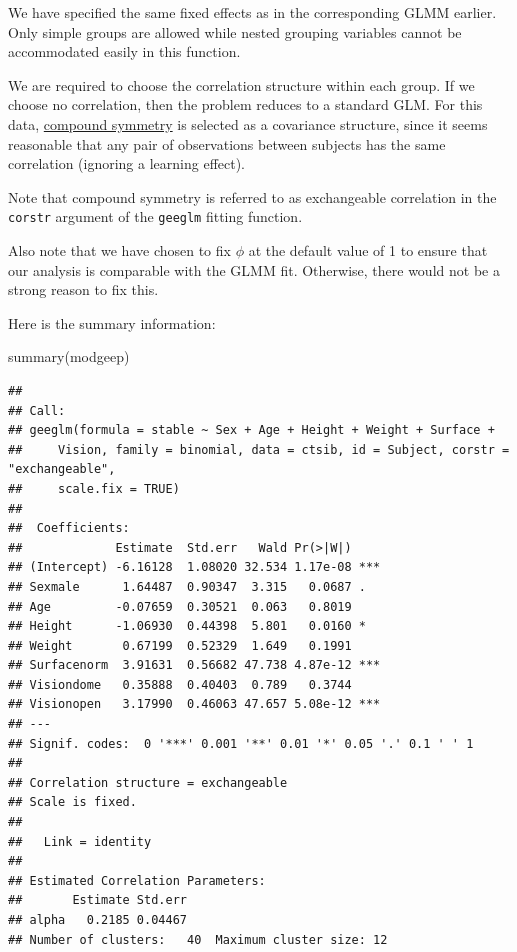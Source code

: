 \documentclass[
  ignorenonframetext,
]{beamer}
\newenvironment{Shaded}{\begin{snugshade}}{\end{snugshade}}
\newcommand{\FunctionTok}[1]{\textcolor[rgb]{0.00,0.00,0.00}{#1}}
\newcommand{\NormalTok}[1]{#1}
\begin{document}
\begin{frame}{}
\protect\hypertarget{section-20}{}
We have specified the same fixed effects as in the corresponding GLMM
earlier. Only simple groups are allowed while nested grouping variables
cannot be accommodated easily in this function.

We are required to choose the correlation structure within each group.
If we choose no correlation, then the problem reduces to a standard GLM.
For this data,
\href{https://norcalbiostat.github.io/AppliedStatistics_notes/specifying-correlation-structures.html}{compound
symmetry} is selected as a covariance structure, since it seems
reasonable that any pair of observations between subjects has the same
correlation (ignoring a learning effect).

Note that compound symmetry is referred to as exchangeable correlation
in the \texttt{corstr} argument of the \texttt{geeglm} fitting function.

Also note that we have chosen to fix \(\phi\) at the default value of 1
to ensure that our analysis is comparable with the GLMM fit. Otherwise,
there would not be a strong reason to fix this.
\end{frame}

\begin{frame}[fragile]{}
\protect\hypertarget{section-21}{}
Here is the summary information:

\vspace{12pt}
\tiny

\begin{Shaded}
\begin{Highlighting}[]
\FunctionTok{summary}\NormalTok{(modgeep)}
\end{Highlighting}
\end{Shaded}

\begin{verbatim}
## 
## Call:
## geeglm(formula = stable ~ Sex + Age + Height + Weight + Surface + 
##     Vision, family = binomial, data = ctsib, id = Subject, corstr = "exchangeable", 
##     scale.fix = TRUE)
## 
##  Coefficients:
##             Estimate  Std.err   Wald Pr(>|W|)    
## (Intercept) -6.16128  1.08020 32.534 1.17e-08 ***
## Sexmale      1.64487  0.90347  3.315   0.0687 .  
## Age         -0.07659  0.30521  0.063   0.8019    
## Height      -1.06930  0.44398  5.801   0.0160 *  
## Weight       0.67199  0.52329  1.649   0.1991    
## Surfacenorm  3.91631  0.56682 47.738 4.87e-12 ***
## Visiondome   0.35888  0.40403  0.789   0.3744    
## Visionopen   3.17990  0.46063 47.657 5.08e-12 ***
## ---
## Signif. codes:  0 '***' 0.001 '**' 0.01 '*' 0.05 '.' 0.1 ' ' 1
## 
## Correlation structure = exchangeable 
## Scale is fixed.
## 
##   Link = identity 
## 
## Estimated Correlation Parameters:
##       Estimate Std.err
## alpha   0.2185 0.04467
## Number of clusters:   40  Maximum cluster size: 12
\end{verbatim}
\end{frame}
\end{document}
